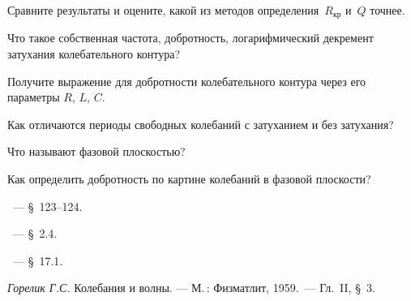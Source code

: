 \begin{lab:task}
\item Сравните результаты и оцените, какой из методов определения~$R_\text{кр}$ и~$Q$ 
точнее.

\end{lab:task}


\begin{lab:questions}
	\item Что такое собственная частота, добротность, логарифмический декремент
затухания колебательного контура?
    \item Получите выражение для добротности колебательного контура через его 
    параметры $R$, $L$, $C$.
    \item Как отличаются периоды свободных колебаний с затуханием и без затухания?
	\item Что называют фазовой плоскостью?
	\item  Как определить добротность по картине колебаний в фазовой плоскости?
\end{lab:questions}


\begin{lab:literature}
	\item \SivuhinIII~--- \S~123--124.
	\item \KingLokOlh~--- \S~2.4.
	\item \Kirichenko~--- \S~17.1.
	\item \textit{Горелик Г.С.} Колебания и волны. --- М.\,: Физматлит, 1959.~--- 
	Гл.~II, \S~3.
\end{lab:literature}
